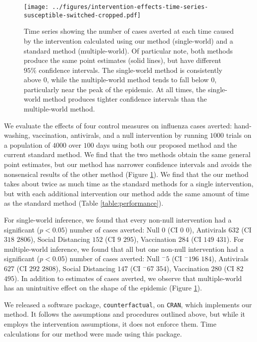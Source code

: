 \documentclass[PTRSB]{rsos}
\makeatletter
\renewcommand{\neg}{{}^-}
\def\checkGraphicsWidth{\ifdim\Gin@nat@width>\linewidth
	\tsGraphicsScaleX\linewidth\else\Gin@nat@width\fi}
\let\ts@includegraphics\includegraphics
\renewcommand{\includegraphics}[1]{\ts@includegraphics[width=\checkGraphicsWidth]{#1}}
\makeatother
\begin{document}
\begin{multicols}{2}
\begin{figure}
\centering
\texttt{[image: ../figures/intervention-effects-time-series-susceptible-switched-cropped.pdf]}
\caption{Time series showing the number of cases averted at each time caused by the intervention calculated using our method (single-world) and a standard method (multiple-world).  Of particular note, both methods produce the same point estimates (solid lines), but have different $95\%$ confidence intervals.  The single-world method is consistently above $0$, while the multiple-world method tends to fall below $0$, particularly near the peak of the epidemic.  At all times, the single-world method produces tighter confidence intervals than the multiple-world method.}
\label{fig:epicurve}
\end{figure}

We evaluate the effects of four control measures on influenza cases averted: hand-washing, vaccination, antivirals, and a null intervention by running $1000$ trials on a population of $4000$ over $100$ days using both our proposed method and the current standard method.
We find that the two methods obtain the same general point estimates, but our method has narrower confidence intervals and avoids the nonsensical results of the other method (Figure \ref{fig:epicurve}).
We find that the our method takes about twice as much time as the standard methods for a single intervention, but with each additional intervention our method adds the same amount of time as the standard method (Table \ref{table:performance}).

For single-world inference, we found that every non-null intervention had a significant ($p<0.05$) number of cases averted: Null $ 0 $ (CI $ 0 $ \textemdash $ 0 $), Antivirals $ 632 $ (CI $ 318 $ \textemdash $ 2806 $), Social Distancing $ 152 $ (CI $ 9 $ \textemdash $ 295 $), Vaccination $ 284 $ (CI $ 149 $ \textemdash $ 431 $).
For multiple-world inference, we found that all but one non-null intervention had a significant ($p<0.05$) number of cases averted: Null $ \neg5 $ (CI $ \neg196 $ \textemdash $ 184 $), Antivirals $ 627 $ (CI $ 292 $ \textemdash $ 2808 $), Social Distancing $ 147 $ (CI $ \neg67 $ \textemdash $ 354 $), Vaccination $ 280 $ (CI $ 82 $ \textemdash $ 495 $).
In addition to estimates of cases averted, we observe that multiple-world has an unintuitive effect on the shape of the epidemic (Figure \ref{fig:epicurve}).

We released a software package, \texttt{counterfactual}, on \texttt{CRAN}, %
which implements our method.
It follows the assumptions and procedures outlined above, but while it employs the intervention assumptions, it does not enforce them.
Time calculations for our method were made using this package.


\end{multicols}
\end{document}
